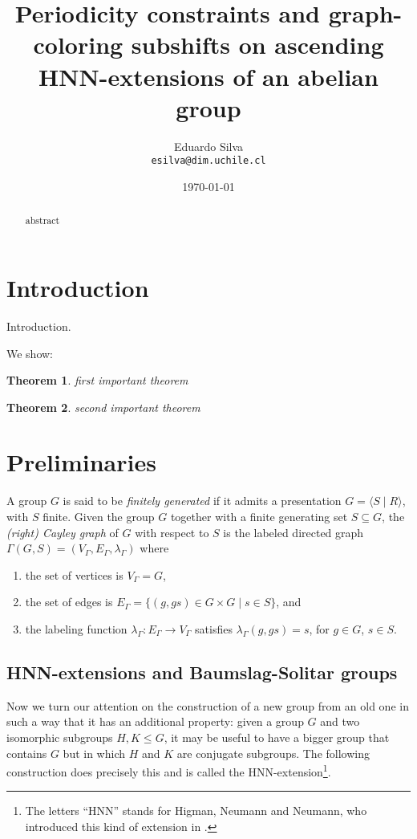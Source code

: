 \documentclass[letterpaper,10pt]{article}
\title{Periodicity constraints and graph-coloring subshifts on ascending HNN-extensions of an abelian group}
\date{\today}
\author{Eduardo Silva \\
	\texttt{esilva@dim.uchile.cl}}
\theoremstyle{plain}
\newtheorem{theorem}{Theorem}[section]
\begin{document}
	
	\maketitle 
	
	\begin{abstract}
	abstract
	\end{abstract}	
	
	
	\section*{Introduction}
	\label{section.introduction}
	
	Introduction.
	
	We show:
	
	{
		\renewcommand{\thetheorem}{\ref{theorem.free_subflow}}
		\begin{theorem}
	 first important theorem
		\end{theorem}
		\addtocounter{theorem}{-1}
	}
	
	
	{
		\renewcommand{\thetheorem}{\ref{theorem.strongly_aperiodic1}}
		\begin{theorem}
		second important theorem
		\end{theorem}
		\addtocounter{theorem}{-1}
	}	
	
	
	\section{Preliminaries}\label{section.preliminaries}
A group $G$ is said to be \emph{finitely generated} if it admits a presentation $G=\langle S\mid R\rangle$, with $S$ finite. Given the group $G$ together with a finite generating set $S\subseteq G$, the \emph{(right) Cayley graph} of $G$ with respect to $S$ is the labeled directed graph  $\Gamma(G,S)=(V_{\Gamma},E_{\Gamma},\lambda_{\Gamma})$ where
\begin{enumerate}
	\item the set of vertices is $V_\Gamma=G$, 
	\item the set of edges is $E_{\Gamma}=\{(g,gs)\in G\times G\mid s\in S\}$, and
	\item the labeling function $\lambda_{\Gamma}:E_{\Gamma}\to V_{\Gamma}$ satisfies $\lambda_{\Gamma}(g,gs)=s$, for $g\in G$, $s\in S$.
\end{enumerate}

	  \subsection{HNN-extensions and Baumslag-Solitar groups}
Now we turn our attention on the construction of a new group from an old one in such a way that it has an additional property: given a group $G$ and two isomorphic subgroups $H,K\le G$, it may be useful to have a bigger group that contains $G$ but in which $H$ and $K$ are conjugate subgroups. The following construction does precisely this and is called the HNN-extension\footnote{The letters ``HNN'' stands for Higman, Neumann and Neumann, who introduced this kind of extension in \cite{HNN49}.}.
\end{document}
